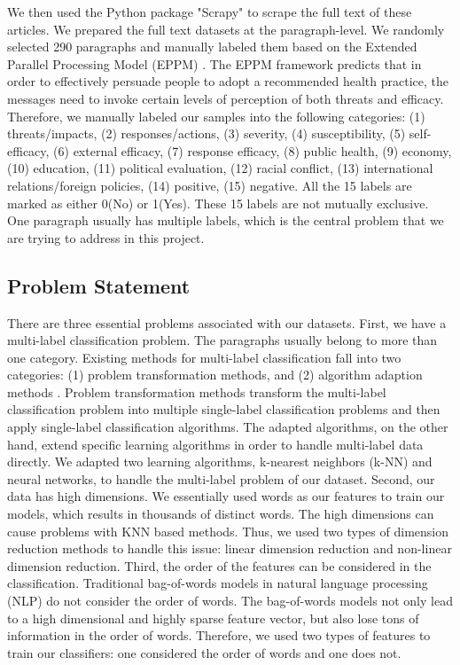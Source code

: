 \documentclass[11pt]{article}
\begin{document}
We then used the Python package "Scrapy" to scrape the full text of these articles. We prepared the full text datasets at the paragraph-level. We randomly selected 290 paragraphs and manually labeled them based on the Extended Parallel Processing Model (EPPM) \cite{witte1992putting, witte1994fear}. The EPPM framework predicts that in order to effectively persuade people to adopt a recommended health practice, the messages need to invoke certain levels of perception of both threats and efficacy. Therefore, we manually labeled our samples into the following categories: (1) threats/impacts, (2) responses/actions, (3) severity, (4) susceptibility, (5) self-efficacy, (6) external efficacy, (7) response efficacy, (8) public health, (9) economy, (10) education, (11) political evaluation, (12) racial conflict, (13) international relations/foreign policies, (14) positive, (15) negative. All the 15 labels are marked as either 0(No) or 1(Yes). These 15 labels are not mutually exclusive. One paragraph usually has multiple labels, which is the central problem that we are trying to address in this project.

\subsection{Problem Statement}

There are three essential problems associated with our datasets. First, we have a multi-label classification problem. The paragraphs usually belong to more than one category. Existing methods for multi-label classification fall into two categories: (1) problem transformation methods, and (2) algorithm adaption methods \cite{tsoumakas2007multi}. Problem transformation methods transform the multi-label classification problem into multiple single-label classification problems and then apply single-label classification algorithms. The adapted algorithms, on the other hand, extend specific learning algorithms in order to handle multi-label data directly. We adapted two learning algorithms, k-nearest neighbors (k-NN) and neural networks, to handle the multi-label problem of our dataset. Second, our data has high dimensions. We essentially used words as our features to train our models, which results in thousands of distinct words. The high dimensions can cause problems with KNN based methods. Thus, we used two types of dimension reduction methods to handle this issue: linear dimension reduction and non-linear dimension reduction. Third, the order of the features can be considered in the classification. Traditional bag-of-words models in natural language processing (NLP) do not consider the order of words. The bag-of-words models not only lead to a high dimensional and highly sparse feature vector, but also lose tons of information in the order of words. Therefore, we used two types of features to train our classifiers: one considered the order of words and one does not. 
\end{document}
